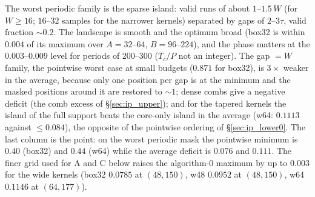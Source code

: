 \documentclass{article}
\numberwithin{equation}{section}   %
\begin{document}
The worst periodic family is the sparse island: valid runs of about $1$--$1.5\,W$ (for $W \ge 16$;
$16$--$32$ samples for the narrower kernels) separated by gaps of $2$--$3\tau$, valid fraction $\sim 0.2$.
The landscape is smooth and the optimum broad (box32 is within $0.004$ of its maximum over $A = 32$--$64$,
$B = 96$--$224$), and the phase matters at the $0.003$--$0.009$ level for periods of $200$--$300$
($T_c/P$ not an integer).  The gap $= W$ family, the pointwise worst case at small budgets ($0.871$ for
box32), is $3\times$ weaker in the average, because only one position per gap is at the minimum and the
masked positions around it are restored to $\sim 1$; dense combs give a negative deficit (the comb excess
of \S\ref{sec:ip_upper}); and for the tapered kernels the island of the full support beats the core-only
island in the average (w64: $0.1113$ against $\le 0.084$), the opposite of the pointwise ordering of
\S\ref{sec:ip_lower0}.  The last column is the point: on the worst periodic mask the pointwise minimum
is $0.40$ (box32) and $0.44$ (w64) while the average deficit is $0.076$ and $0.111$.  The finer grid
used for A and C below raises the algorithm-0 maximum by up to $0.003$ for the wide kernels (box32
$0.0785$ at $(48, 150)$, w48 $0.0952$ at $(48, 150)$, w64 $0.1146$ at $(64, 177)$).
\end{document}
